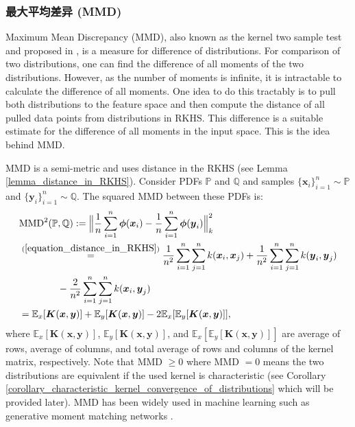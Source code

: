 \documentclass[lang=cn,10pt]{gorgeousnbook}
\numberwithin{equation}{section}%
\numberwithin{figure}{section}%
\begin{document}
\subsubsection{最大平均差异 (MMD)}

Maximum Mean Discrepancy (MMD), also known as the kernel two sample test and proposed in \cite{gretton2006kernel,gretton2012kernel}, is a measure for difference of distributions. 
For comparison of two distributions, one can find the difference of all moments of the two distributions. However, as the number of moments is infinite, it is intractable to calculate the difference of all moments. One idea to do this tractably is to pull both distributions to the feature space and then compute the distance of all pulled data points from distributions in RKHS. This difference is a suitable estimate for the difference of all moments in the input space. This is the idea behind MMD. 

MMD is a semi-metric \cite{simon2020metrizing} and uses distance in the RKHS \cite{scholkopf2001kernel} (see Lemma \ref{lemma_distance_in_RKHS}). 
Consider PDFs $\mathbb{P}$ and $\mathbb{Q}$ and samples $\{\boldsymbol{x}_i\}_{i=1}^n \sim \mathbb{P}$ and $\{\boldsymbol{y}_i\}_{i=1}^n \sim \mathbb{Q}$.
The squared MMD between these PDFs is:
\begin{align}
&\text{MMD}^2(\mathbb{P}, \mathbb{Q}) := \Big\|\frac{1}{n} \sum_{i=1}^n \boldsymbol{\phi}(\boldsymbol{x}_i) - \frac{1}{n} \sum_{i=1}^n \boldsymbol{\phi}(\boldsymbol{y}_i)\Big\|_k^2 \nonumber \\
&\overset{(\ref{equation_distance_in_RKHS})}{=} \frac{1}{n^2} \sum_{i=1}^n \sum_{j=1}^n k(\boldsymbol{x}_i, \boldsymbol{x}_j) + \frac{1}{n^2} \sum_{i=1}^n \sum_{j=1}^n k(\boldsymbol{y}_i, \boldsymbol{y}_j) \nonumber \\
&~~~~~~~~~~~~ - \frac{2}{n^2} \sum_{i=1}^n \sum_{j=1}^n k(\boldsymbol{x}_i, \boldsymbol{y}_j) \nonumber \\
&= \mathbb{E}_{x}[\boldsymbol{K}(\boldsymbol{x}, \boldsymbol{y})] + \mathbb{E}_{y}[\boldsymbol{K}(\boldsymbol{x}, \boldsymbol{y})] - 2\mathbb{E}_{x}[\mathbb{E}_{y}[\boldsymbol{K}(\boldsymbol{x}, \boldsymbol{y})]], 
\end{align}
where $\mathbb{E}_x[\boldsymbol{K}(\boldsymbol{x}, \boldsymbol{y})]$, $\mathbb{E}_y[\boldsymbol{K}(\boldsymbol{x}, \boldsymbol{y})]$, and $\mathbb{E}_x[\mathbb{E}_y[\boldsymbol{K}(\boldsymbol{x}, \boldsymbol{y})]]$ are average of rows, average of columns, and total average of rows and columns of the kernel matrix, respectively.
Note that MMD $\geq 0$ where MMD $=0$ means the two distributions are equivalent if the used kernel is characteristic (see Corollary \ref{corollary_characteristic_kernel_convergence_of_distributions} which will be provided later). 
MMD has been widely used in machine learning such as generative moment matching networks \cite{li2015generative}.
\end{document}

